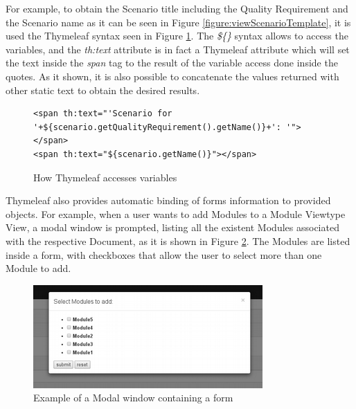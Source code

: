 For example, to obtain the Scenario title including the Quality Requirement and the Scenario name as it can be seen in Figure \ref{figure:viewScenarioTemplate}, it is used the Thymeleaf syntax seen in Figure \ref{figure:viewsCallingMethods}. The \textit{\$\{\}} syntax allows to access the variables, and the \textit{th:text} attribute is in fact a Thymeleaf attribute which will set the text inside the \textit{span} tag to the result of the variable access done inside the quotes. As it shown, it is also possible to concatenate the values returned with other static text to obtain the desired results.
\begin{figure}[h]
\lstset{style=customhtml}
\begin{lstlisting}
<span th:text="'Scenario for '+${scenario.getQualityRequirement().getName()}+': '">
</span> 
<span th:text="${scenario.getName()}"></span>
\end{lstlisting}
\caption{How Thymeleaf accesses variables}
\label{figure:viewsCallingMethods}
\end{figure}

Thymeleaf also provides automatic binding of forms information to provided objects. For example, when a user wants to add Modules to a Module Viewtype View, a modal window is prompted, listing all the existent Modules associated with the respective Document, as it is shown in Figure \ref{figure:viewsModalFormExample}. The Modules are listed inside a form, with checkboxes that allow the user to select more than one Module to add. 

\begin{figure}[h]
\centering
\includegraphics{images/modalExample}
\caption{Example of a Modal window containing a form}
\label{figure:viewsModalFormExample}
\end{figure}

